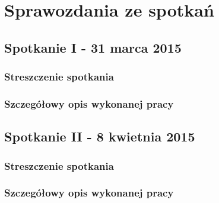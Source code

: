\par{}

\section{Sprawozdania ze spotkań}

\par{}

\subsection*{Spotkanie I - 31 marca 2015}

\par{}

\subsubsection*{Streszczenie spotkania}

\par{}

\subsubsection*{Szczegółowy opis wykonanej pracy}

\par{}

\subsection*{Spotkanie II - 8 kwietnia 2015}

\par{}

\subsubsection*{Streszczenie spotkania}

\par{}

\subsubsection*{Szczegółowy opis wykonanej pracy}

\par{}